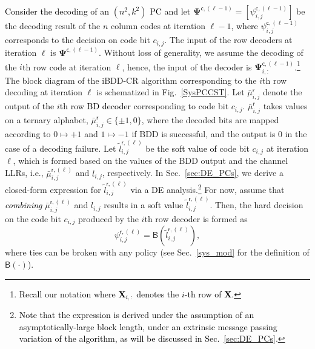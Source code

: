 \documentclass[journal]{IEEEtran}
\newcommand{\row}{\mathsf{r}}
\newcommand{\nc}{n}
\newcommand{\BB}{\mathsf{B}}
\newcommand{\SH}{\textcolor{black}}
\newcommand{\GL}{\textcolor{black}}
\newcommand{\AG}{\textcolor{black}}
\newcommand{\AGc}{\textcolor{black}}
\begin{document}
\AG{Consider the decoding of an $(n^2,k^2)$ PC and} let $\bm{\Psi}^{\mathsf{c},(\ell-1)}=[\psi_{i,j}^{\mathsf{c},(\ell-1)}]$ be the decoding result of the $\nc$ column codes at iteration $\ell-1$, \AG{where} $\psi_{i,j}^{\mathsf{c},(\ell-1)}$ corresponds to the decision on code bit $c_{i,j}$. The input of the row decoders at iteration $\ell$ is $\bm{\Psi}^{\mathsf{c},(\ell-1)}$. Without loss of generality, we assume the decoding of the $i$th row code at iteration $\ell$, hence, the input of the decoder is $\bm{\Psi}^{\mathsf{c},(\ell-1)}_{i,:}$.\footnote{\SH{Recall our notation where $\boldsymbol{X}_{i,:}$ denotes the $i$-th row of $\boldsymbol{X}$.}} %
The block diagram of the iBDD-CR algorithm corresponding to the $i$th row decoding at iteration $\ell$ is schematized in Fig.~\ref{SysPCCST}. Let $\bar\mu_{i,j}^{\mathsf r}$ denote the output of \AG{the $i$th row BD decoder}   corresponding to code bit $c_{i,j}$. $\bar\mu_{i,j}^{\mathsf r}$ takes values on a ternary alphabet, $\bar\mu_{i,j}^{\mathsf r} \in \{\pm1, 0 \}$, where the decoded bits are mapped according to $0\mapsto +1$ and $1\mapsto -1$ if BDD is successful, and the output is $0$ in the case of a decoding failure. Let $\tilde{l}_{i,j}^{\mathsf r, (\ell)}$ be the \GL{soft value of} code bit $c_{i,j}$ at iteration $\ell$, which is formed based on the values of the BDD output and the channel LLRs, i.e., $\bar \mu _{i,j}^{\row,(\ell )}$ and $l_{i,j}$, respectively. In Sec.~\ref{sec:DE_PCs}, we derive a closed-form expression for $\tilde{l}_{i,j}^{\mathsf r, (\ell)}$ \AG{via a DE} analysis.\footnote{\GL{Note that the expression is derived under the assumption of an asymptotically-large block length, under an extrinsic message passing variation of the algorithm, as will be discussed in Sec.~\ref{sec:DE_PCs}}.} For now, assume that \GL{\emph{combining}}  $\bar \mu _{i,j}^{\mathsf r,(\ell )}$ and $l_{i,j}$ results in \GL{a soft value} $\tilde{l}_{i,j}^{\mathsf r, (\ell)}$. 
Then, the hard decision on the code bit $c_{i,j}$ produced by the $i$th row decoder is formed as%
\begin{equation}\label{eq:BDDchrel_VN}
\psi_{i,j}^{\mathsf{r},(\ell)}=
\mathsf{B}(\tilde{l}_{i,j}^{\mathsf r, (\ell)}) , 
\end{equation}
where ties can be broken with any policy (see Sec.~\ref{sys_mod} for the definition of $\BB(\cdot)$).
\end{document}

